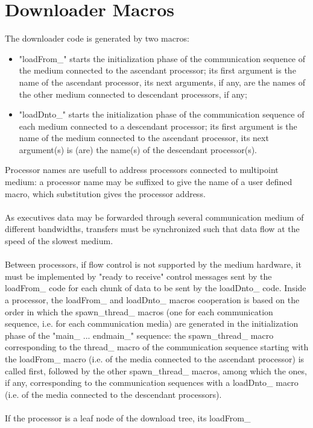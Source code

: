 \documentclass[11pt,twoside]{report}
\begin{document}
\section{Downloader Macros}
The downloader code is generated by two macros:
\begin{itemize}
\item "loadFrom\_" starts the initialization phase of the communication
  sequence of the medium connected to the ascendant processor; its first
  argument is the name of the ascendant processor, its next arguments,
  if any, are the names of the other medium connected to descendant
  processors, if any;
\item "loadDnto\_" starts the initialization phase of the communication
  sequence of each medium connected to a descendant processor; its first
  argument is the name of the medium connected to the ascendant
  processor, its next argument(s) is (are) the name(s) of the descendant
  processor(s).
\end{itemize}
Processor names are usefull to address processors connected to
multipoint medium: a processor name may be suffixed to give the name of
a user defined macro, which substitution gives the processor address.\\\\
As executives data may be forwarded through several communication medium
of different bandwidths, transfers must be synchronized such that data
flow at the speed of the slowest medium.\\\\
Between processors, if flow control is not supported by the medium
hardware, it must be implemented by "ready to receive" control messages
sent by the loadFrom\_ code for each chunk of data to be sent by the
loadDnto\_ code. Inside a processor, the loadFrom\_ and loadDnto\_
macros cooperation is based on the order in which the spawn\_thread\_
macros (one for each communication sequence, i.e. for each communication
media) are generated in the initialization phase of the "main\_
... endmain\_" sequence: the spawn\_thread\_ macro corresponding to the
thread\_ macro of the communication sequence starting with the
loadFrom\_ macro (i.e. of the media connected to the ascendant
processor) is called first, followed by the other spawn\_thread\_
macros, among which the ones, if any, corresponding to the communication
sequences with a loadDnto\_ macro (i.e. of the media connected to the
descendant processors).\\\\
If the processor is a leaf node of the download tree, its loadFrom\_
\end{document}
